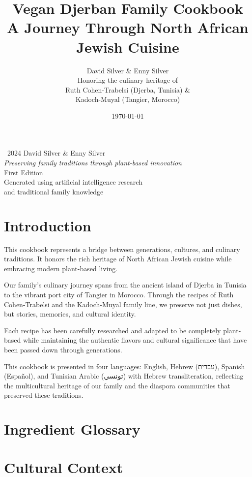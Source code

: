 \documentclass{cookbook}
\title{Vegan Djerban Family Cookbook\\
       \large A Journey Through North African Jewish Cuisine}
\author{David Silver \& Enny Silver\\
        \small Honoring the culinary heritage of\\
        \small Ruth Cohen-Trabelsi (Djerba, Tunisia) \&\\
        \small Kadoch-Muyal (Tangier, Morocco)}
\date{\today}
\begin{document}
\maketitle
\thispagestyle{empty}

\clearpage
\thispagestyle{empty}
\vspace*{\fill}
\begin{center}
\textcopyright\ 2024 David Silver \& Enny Silver\\[1em]
\textit{Preserving family traditions through plant-based innovation}\\[2em]
First Edition\\[1em]
Generated using artificial intelligence research\\
and traditional family knowledge
\end{center}
\vspace*{\fill}

\clearpage
\tableofcontents

\chapter*{Introduction}

This cookbook represents a bridge between generations, cultures, and culinary traditions. It honors the rich heritage of North African Jewish cuisine while embracing modern plant-based living.

Our family's culinary journey spans from the ancient island of Djerba in Tunisia to the vibrant port city of Tangier in Morocco. Through the recipes of Ruth Cohen-Trabelsi and the Kadoch-Muyal family line, we preserve not just dishes, but stories, memories, and cultural identity.

Each recipe has been carefully researched and adapted to be completely plant-based while maintaining the authentic flavors and cultural significance that have been passed down through generations.

\begin{culturalcontext}
This cookbook is presented in four languages: English, Hebrew (עברית), Spanish (Español), and Tunisian Arabic (تونسي) with Hebrew transliteration, reflecting the multicultural heritage of our family and the diaspora communities that preserved these traditions.
\end{culturalcontext}









\appendix
\chapter{Ingredient Glossary}


\chapter{Cultural Context}


\printindex
\end{document}
